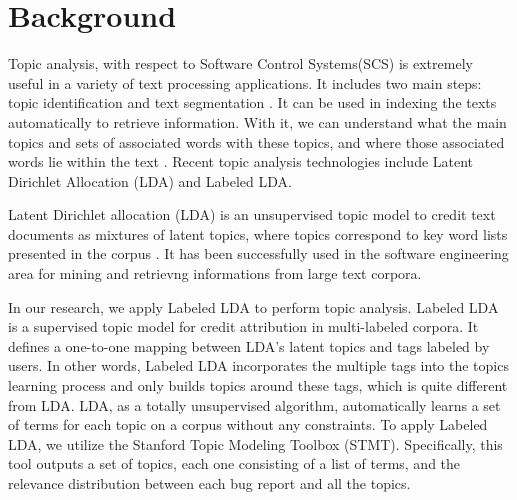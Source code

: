\documentclass[10pt, conference, compsocconf]{IEEEtran}
\begin{document}



\section{Background}
Topic analysis, with respect to Software Control Systems(SCS) is extremely useful in a variety of text processing applications\cite{hindle9s}. It includes two main steps: topic identification and text segmentation \cite{li2003topic}. It can be used in indexing the texts automatically to retrieve information.
With it, we can understand what the main topics and sets of associated words with these topics, and where those associated words lie within the text \cite{li2003topic}. Recent topic analysis technologies include Latent Dirichlet Allocation (LDA) and Labeled LDA.

Latent Dirichlet allocation (LDA) is an unsupervised topic model to credit text documents as mixtures of latent topics, where topics correspond to key word lists presented in the corpus \cite{ldawiki}. It has been successfully used in the software engineering area for mining and retrievng informations from large text corpora.

In our research, we apply Labeled LDA to perform topic analysis. Labeled LDA is a supervised topic model for credit attribution in multi-labeled corpora\cite{labeledlda}. It defines a one-to-one mapping between LDA’s latent topics and tags labeled by users. In other words, Labeled LDA incorporates the multiple tags into the topics learning process and only builds topics around these tags, which is quite different from LDA. LDA, as a totally unsupervised algorithm, automatically learns a set of terms for each topic on a corpus without any constraints. To apply Labeled LDA, we utilize the Stanford Topic Modeling Toolbox (STMT)\cite{stmt}. Specifically, this tool outputs a set of topics, each one consisting of a list of terms, and the relevance distribution between each bug report and all the topics.


\end{document}

